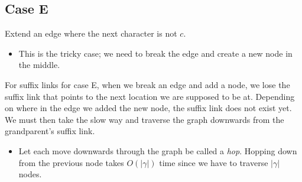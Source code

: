 \documentclass[10pt]{article}
\begin{document}
\subsection*{Case E}
Extend an edge where the next character is not $c$.
\begin{itemize}
	\item This is the tricky case; we need to break the edge and create a new node in the middle.
\end{itemize}
\begin{center}
\end{center}
For suffix links for case E, when we break an edge and add a node, we lose the suffix link that points to the next location we are supposed to be at.  Depending on where in the edge we added the new node, the suffix link does not exist yet.  We must then take the slow way and traverse the graph downwards from the grandparent's suffix link.
\begin{itemize}
	\item Let each move downwards through the graph be called a \textit{hop}.  Hopping down from the previous node takes $O(|\gamma|)$ time since we have to traverse $|\gamma|$ nodes.
\end{itemize}
\end{document}
